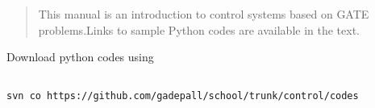 \documentclass[journal,12pt,twocolumn]{IEEEtran}
\begin{document}
















%




\begin{abstract}

This manual is an introduction to control systems based on GATE problems.Links to sample Python codes are available in the text.  

\end{abstract}

Download python codes using 

\begin{lstlisting}

svn co https://github.com/gadepall/school/trunk/control/codes

\end{lstlisting}
\end{document}
